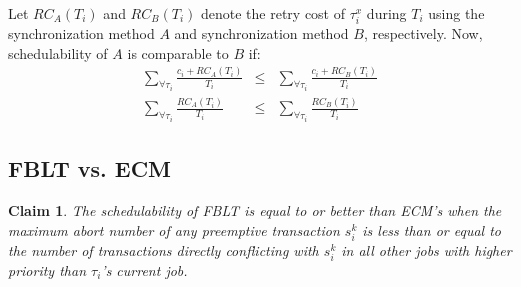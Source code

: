 \documentclass[prodmode,acmtecs]{acmsmall}
\newtheorem{clm}{Claim}
\begin{document}
Let $RC_{A}(T_{i})$ and $RC_{B}(T_{i})$ denote the retry cost of $\tau_{i}^{x}$ 
during $T_{i}$ using the synchronization method $A$ and synchronization
method $B$, respectively. 
Now, schedulability of $A$ is comparable to $B$ if:
\begin{eqnarray}
\sum_{\forall\tau_{i}}\frac{c_{i}+RC_{A}(T_{i})}{T_{i}} & \le & \sum_{\forall\tau_{i}}\frac{c_{i}+RC_{B}(T_{i})}{T_{i}}\nonumber \\
\sum_{\forall\tau_{i}}\frac{RC_{A}(T_{i})}{T_{i}} & \le & \sum_{\forall\tau_{i}}\frac{RC_{B}(T_{i})}{T_{i}}\label{eq:utilization comparison}
\end{eqnarray}



\subsection{FBLT vs. ECM}

\begin{clm}\label{clm:fblt_ecm}
The schedulability of FBLT is equal to or better than ECM's when the maximum abort number of any preemptive transaction $s_i^k$ is less than or equal to the number of transactions directly conflicting with $s_i^k$ in all other jobs with higher priority than $\tau_{i}$'s current job. 
\end{clm}
\end{document}
